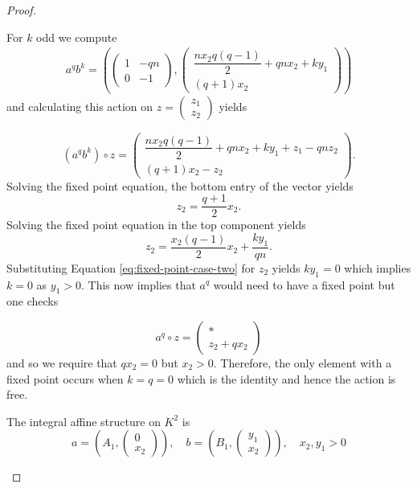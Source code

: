 \begin{proof}
\begin{case}[$A=A_1$, $B=B_1$]
        For $k$ odd we compute
        \begin{align*}
            a^qb^k = \left( \begin{pmatrix}
                                1 & -qn \\
                                0 & -1
                            \end{pmatrix}, \begin{pmatrix}
                                               \dfrac{nx_2q(q-1)}{2} + qnx_2 + ky_1 \\
                                               (q+1)x_2
                                           \end{pmatrix} \right)
        \end{align*}
        and calculating this action on $z = \begin{pmatrix}
                z_1 \\ z_2
            \end{pmatrix}$ yields

        $$
            (a^qb^k) \circ z = \begin{pmatrix}
                \dfrac{nx_2q(q-1)}{2} + qnx_2 + ky_1 + z_1 - qnz_2 \\
                (q+1)x_2 - z_2
            \end{pmatrix}.
        $$
        Solving the fixed point equation, the bottom entry of the vector yields
        \begin{equation}
            \label{eq:fixed-point-case-two}
            z_2 = \dfrac{q+1}{2}x_2.
        \end{equation}
        Solving the fixed point equation in the top component yields
        $$
            z_2 = \dfrac{x_2(q-1)}{2}x_2 + \dfrac{ky_1}{qn}.
        $$
        Substituting Equation \ref{eq:fixed-point-case-two} for $z_2$ yields $ky_1 = 0$ which implies $k=0$ as $y_1>0$.
        This now implies that $a^q$ would need to have a fixed point but one checks

        $$a^q \circ z = \begin{pmatrix}
                * \\
                z_2 + qx_2
            \end{pmatrix}$$
        and so we require that $qx_2 =0$ but $x_2>0$. Therefore, the only element with a fixed point occurs when $k=q=0$ which is the identity and hence the action is free.

        The integral affine structure on $K^2$ is $$a = \left(A_1, \begin{pmatrix}
                    0 \\ x_2
                \end{pmatrix}\right), \quad b = \left(B_1, \begin{pmatrix}
                    y_1 \\ x_2
                \end{pmatrix}\right), \quad x_2, y_1>0$$


\end{case}
\end{proof}
